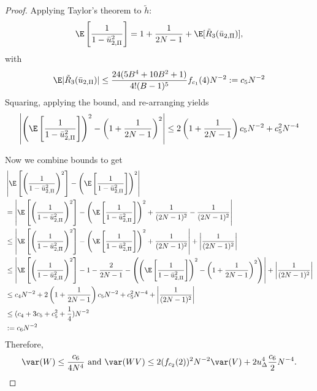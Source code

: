 \begin{proof}
  Applying Taylor's theorem to $\tilde{h}$:
  \begin{equation*}
    \E \left [ \frac{1}{1-\bar{u}_{2,\Pi}^2} \right ]
    = 1 + \frac{1}{2N-1} + \E [\tilde{R}_3(\bar{u}_{2,\Pi})],
  \end{equation*}
  with
  \begin{equation*}
    \E |\tilde{R}_3(\bar{u}_{2,\Pi})| \leq \frac{24(5B^4 + 10B^2 + 1)}{4!(B-1)^5}f_{c_1}(4) N^{-2}
    := c_5 N^{-2}
  \end{equation*}
  Squaring, applying the bound, and re-arranging yields
  \begin{equation*}
    \left | \left ( \E \left [ \frac{1}{1-\bar{u}_{2,\Pi}^2} \right ] \right )^2 
      - \left ( 1 + \frac{1}{2N-1} \right )^2 \right | \leq 
    2 \left ( 1 + \frac{1}{2N-1} \right ) c_5 N^{-2} + c_5^2 N^{-4}
  \end{equation*}
  
  Now we combine bounds to get
  \begin{align*}
    &\left | \E \left [ \left (\frac{1}{1-\bar{u}_{2,\Pi}^2} \right )^2 \right ] - 
      \left ( \E \left [ \frac{1}{1-\bar{u}_{2,\Pi}^2} \right ] \right )^2 \right | \\
    &= \left | \E \left [ \left (\frac{1}{1-\bar{u}_{2,\Pi}^2} \right )^2 \right ] - 
      \left ( \E \left [ \frac{1}{1-\bar{u}_{2,\Pi}^2} \right ] \right )^2 
    + \frac{1}{(2N-1)^2} - \frac{1}{(2N-1)^2} \right | \\
  &\leq \left | \E \left [ \left (\frac{1}{1-\bar{u}_{2,\Pi}^2} \right )^2 \right ] - 
      \left ( \E \left [ \frac{1}{1-\bar{u}_{2,\Pi}^2} \right ] \right )^2 
      + \frac{1}{(2N-1)^2} \right | + \left | \frac{1}{(2N-1)^2} \right |\\
    &\leq \left | 
      \E \left [ \left (\frac{1}{1-\bar{u}_{2,\Pi}^2} \right )^2 \right ]
      - 1 - \frac{2}{2N-1} - 
      \left ( 
        \left ( \E \left [ \frac{1}{1-\bar{u}_{2,\Pi}^2} \right ] \right )^2 
        - \left ( 1 + \frac{1}{2N-1} \right )^2 
      \right ) \right | + \left | \frac{1}{(2N-1)^2} \right | \\
    &\leq c_4 N^{-2}
    + 2 \left ( 1 + \frac{1}{2N-1} \right ) c_5 N^{-2} + c_5^2 N^{-4} 
    + \left | \frac{1}{(2N-1)^2} \right | \\
    &\leq (c_4 + 3c_5 + c_5^2 + \frac{1}{4}) N^{-2} \\
    &:= c_6 N^{-2}
  \end{align*}
  Therefore,
  \begin{equation*}
    \var(W) \leq \frac{c_6}{4N^4} \text{ and } 
    \var(WV) \leq 2(f_{c_2}(2))^2 N^{-2} \var(V) + 2u_{\Delta}^4 \frac{c_6}{2} N^{-4}.
  \end{equation*}


\end{proof}

